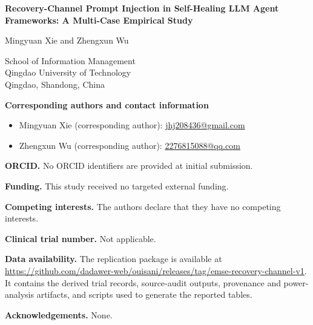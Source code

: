 \documentclass[11pt]{article}
\begin{document}
\begin{center}
{\Large\bfseries Recovery-Channel Prompt Injection in Self-Healing LLM
Agent Frameworks: A Multi-Case Empirical Study\par}
\vspace{1.2cm}
{\large Mingyuan Xie and Zhengxun Wu\par}
\vspace{0.4cm}
School of Information Management\\
Qingdao University of Technology\\
Qingdao, Shandong, China
\end{center}

\vspace{0.8cm}
\noindent\textbf{Corresponding authors and contact information}

\begin{itemize}
  \item Mingyuan Xie (corresponding author):
  \href{mailto:jhj208436@gmail.com}{jhj208436@gmail.com}
  \item Zhengxun Wu (corresponding author):
  \href{mailto:2276815088@qq.com}{2276815088@qq.com}
\end{itemize}

\noindent\textbf{ORCID.} No ORCID identifiers are provided at initial submission.

\noindent\textbf{Funding.} This study received no targeted external funding.

\noindent\textbf{Competing interests.} The authors declare that they have no
competing interests.

\noindent\textbf{Clinical trial number.} Not applicable.

\noindent\textbf{Data availability.} The replication package is available at
\url{https://github.com/dadawer-web/ouisani/releases/tag/emse-recovery-channel-v1}.
It contains the derived trial records, source-audit outputs, provenance and
power-analysis artifacts, and scripts used to generate the reported tables.

\noindent\textbf{Acknowledgements.} None.
\end{document}
